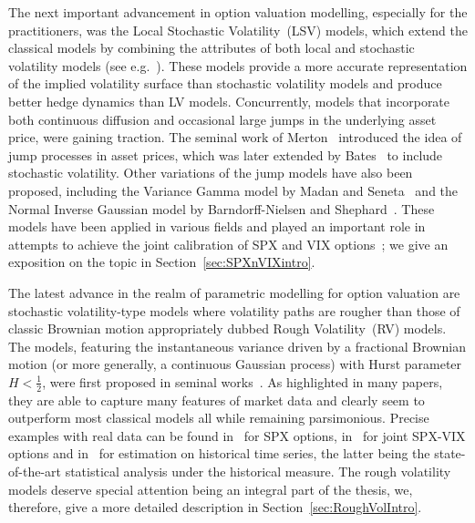 The next important advancement in option valuation modelling, especially for the practitioners, was the Local Stochastic Volatility~(LSV) models, which extend the classical models by combining the attributes of both local and stochastic volatility models (see e.g.~\cite{Lipton2002TheProblem, Lipton2002UniversalBarriers}). These models provide a more accurate representation of the implied volatility surface than stochastic volatility models and produce better hedge dynamics than LV models. %
Concurrently, models that incorporate both continuous diffusion and occasional large jumps in the underlying asset price, were gaining traction. The seminal work of Merton~\cite{Merton1974ONRATES} introduced the idea of jump processes in asset prices, which was later extended by Bates~\cite{Bates1996JumpsOptions} to include stochastic volatility. %
Other variations of the jump models have also been proposed, including the Variance Gamma model by Madan and Seneta~\cite{Madan1990TheReturns} and the Normal Inverse Gaussian model by Barndorff-Nielsen and Shephard~\cite{Barndorff-Nielsen2001Non-GaussianEconomics}. These models have been applied in various fields and played an important role in attempts to achieve the joint calibration of SPX and VIX options~\cite{Cont2011ADERIVATIVES, Baldeaux2014ConsistentModel, Kokholm2015JointModels}; we give an exposition on the topic in Section~\ref{sec:SPXnVIXintro}. %

The latest advance in the realm of parametric modelling for option valuation are stochastic volatility-type models where volatility paths are rougher than those of classic Brownian motion appropriately dubbed Rough Volatility~(RV) models. The models, featuring the instantaneous variance driven by a fractional Brownian motion (or more generally, a continuous Gaussian process) with Hurst parameter $H < \frac{1}{2}$, were first proposed in seminal works~\cite{Bayer2015PricingVolatility, Gatheral2018VolatilityRough, Guennoun2018AsymptoticModel}. As highlighted in many papers, they are able to capture many features of market data and clearly seem to outperform most classical models all while remaining parsimonious. Precise examples with real data can be found in~\cite{Bayer2015PricingVolatility} for SPX options, in~\cite{Bondi2022TheModel, Gatheral2020TheProblem, Jaber2022JointHints, Horvath2020VolatilityModels} for joint SPX-VIX options and in~\cite{Bennedsen2022DecouplingVolatility, Gatheral2018VolatilityRough} for estimation on historical time series, the latter  being the state-of-the-art statistical analysis under the historical measure. The rough volatility models deserve special attention being an integral part of the thesis, we, therefore, give a more detailed description in Section~\ref{sec:RoughVolIntro}.

